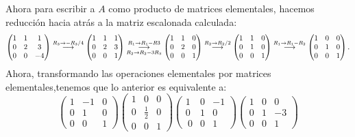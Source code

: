 \documentclass[11pt,letterpaper]{article}
\newcommand{\grstep}[2][\relax]{%
   \ensuremath{\mathrel{
       {\mathop{\longrightarrow}\limits^{#2\mathstrut}_{
                                     \begin{subarray}{l} #1 \end{subarray}}}}}}
\begin{document}
\begin{enumerate}
Ahora para escribir a $A$ como producto de matrices elementales, hacemos reducción hacia atrás a la matriz escalonada calculada:
\begin{equation*}
\begin{pmatrix}
 1 & 1 & 1\\
 0 & 2 & 3\\
 0 & 0 & -4
\end{pmatrix}%
\grstep[]{R_3 \rightarrow -R_3/4}
%
\begin{pmatrix}
 1 & 1 & 1\\
 0 & 2 & 3\\
 0 & 0 & 1
\end{pmatrix}%
\grstep[R_2 \rightarrow R_2-3R_3 ]{R_1 \rightarrow R_1-R3}
%
\begin{pmatrix}
 1 & 1 & 0\\
 0 & 2 & 0\\
 0 & 0 & 1
\end{pmatrix}%
\grstep[]{R_2 \rightarrow R_2/2}
%
\begin{pmatrix}
 1 & 1 & 0\\
 0 & 1 & 0\\
 0 & 0 & 1
\end{pmatrix}%
\grstep[]{R_1 \rightarrow R_1-R_2}
%
\begin{pmatrix}
 1 & 0 & 0\\
 0 & 1 & 0\\
 0 & 0 & 1
\end{pmatrix}.
\end{equation*}
Ahora, transformando las operaciones elementales por matrices elementales,tenemos que lo anterior es equivalente a:
\begin{equation*}
\begin{pmatrix}
 1 &-1 & 0\\
 0 & 1 & 0\\
 0 & 0 & 1
\end{pmatrix}
\begin{pmatrix}
 1 & 0 & 0\\
 0 & \frac{1}{2} & 0\\
 0 & 0 & 1
\end{pmatrix}
\begin{pmatrix}
 1 & 0 & -1\\
 0 & 1 & 0\\\
 0 & 0 & 1
\end{pmatrix}
\begin{pmatrix}
 1 & 0 & 0\\
 0 & 1 & -3\\
 0 & 0 & 1
\end{pmatrix}

\end{equation*}
\end{enumerate}
\end{document}
